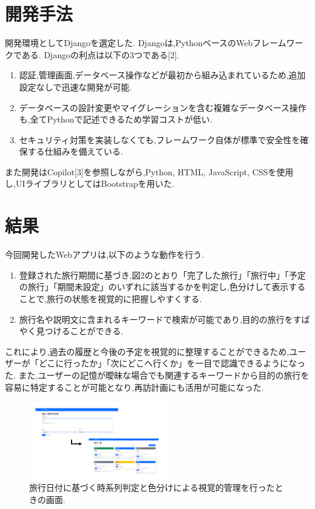 \documentclass[a4j,twocolumn]{jsarticle}
\begin{document}
\section{開発手法}
\label{sec:org1a9cba3}
開発環境としてDjangoを選定した.
Djangoは,PythonベースのWebフレームワークである.
Djangoの利点は以下の3つである[2].
\begin{enumerate}
\item 認証,管理画面,データベース操作などが最初から組み込まれているため,追加設定なしで迅速な開発が可能.
\item データベースの設計変更やマイグレーションを含む複雑なデータベース操作も,全てPythonで記述できるため学習コストが低い.
\item セキュリティ対策を実装しなくても,フレームワーク自体が標準で安全性を確保する仕組みを備えている.
\end{enumerate}
また開発はCopilot[3]を参照しながら,Python, HTML, JavaScript, CSSを使用し,UIライブラリとしてはBootstrapを用いた.

\section{結果}
\label{sec:org5be8d8c}
今回開発したWebアプリは,以下のような動作を行う.

\begin{enumerate}
\item 登録された旅行期間に基づき,図2のとおり「完了した旅行」「旅行中」「予定の旅行」「期間未設定」のいずれに該当するかを判定し,色分けして表示することで,旅行の状態を視覚的に把握しやすくする.
\item 旅行名や説明文に含まれるキーワードで検索が可能であり,目的の旅行をすばやく見つけることができる.
\end{enumerate}
これにより,過去の履歴と今後の予定を視覚的に整理することができるため,ユーザーが「どこに行ったか」「次にどこへ行くか」を一目で認識できるようになった.
また,ユーザーの記憶が曖昧な場合でも関連するキーワードから目的の旅行を容易に特定することが可能となり,再訪計画にも活用が可能になった.

\begin{figure}[htbp]
\centering
\includegraphics[width=6cm]{./figs/trip1.png}
\caption{\label{fig:org0fa2c20}旅行日付に基づく時系列判定と色分けによる視覚的管理を行ったときの画面.}
\end{figure}
\end{document}
